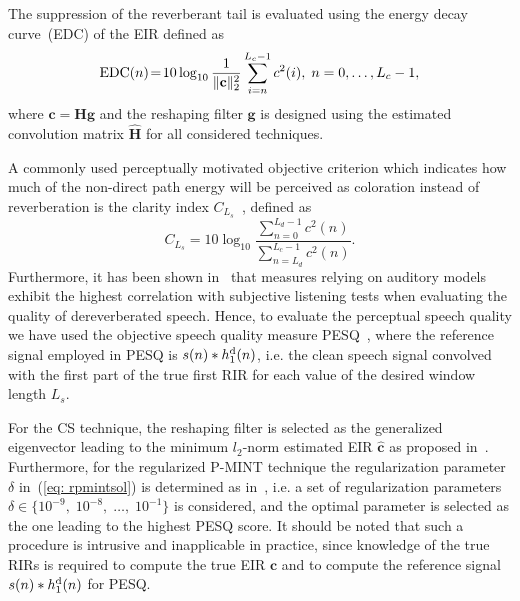 \documentclass{article}
\begin{document}
The suppression of the reverberant tail is evaluated using the energy decay curve~(EDC) of the EIR defined as
\begin{equation}
 \hbox{EDC}(n)\! = \!10 \log_{10}\frac{1}{\|\mathbf{c}\|_2^2}\sum_{i=n}^{L_c-1}c^2(i), \; n = 0,  \ldots,  L_c-1,
\end{equation}
where $\mathbf{c} = \mathbf{H}\mathbf{g}$ and the reshaping filter $\mathbf{g}$ is designed using the estimated convolution matrix $\hat{\mathbf{H}}$ for all considered techniques.

A commonly used perceptually motivated objective criterion which indicates how much of the non-direct path energy will be perceived as coloration instead of reverberation is the clarity index $C_{L_s}$~\cite{Naylor_Derev_book}, defined as
\begin{equation}
  C_{L_s} = 10 \log_{10}  \frac{\sum_{n = 0}^{L_d-1} c^2(n)}{\sum_{n = L_d}^{L_c-1} c^2(n)}.
\end{equation}
Furthermore, it has been shown in~\cite{Goetze_AES_2010} that measures relying on auditory models exhibit the highest correlation with subjective listening tests when evaluating the quality of dereverberated speech.
Hence, to evaluate the perceptual speech quality we have used the objective speech quality measure PESQ~\cite{PESQ}, where the reference signal employed in PESQ is $s(n) \ast h_1^{\rm d}(n)$, i.e. the clean speech signal convolved with the first part of the true first RIR for each value of the desired window length $L_s$.

For the CS technique, the reshaping filter is selected as the generalized eigenvector leading to the minimum $l_2$-norm estimated EIR $\hat{\mathbf{c}}$ as proposed in~\cite{Zhang_IWAENC_2010}. Furthermore, for the regularized P-MINT technique the regularization parameter $\delta$ in~(\ref{eq: rpmintsol}) is determined as in~\cite{Kodrasi_IWAENC_2012}, i.e. a set of regularization parameters $\delta \in \{10^{-9}, \; 10^{-8}, \; \ldots, \; 10^{-1} \}$ is considered, and the optimal parameter is selected as the one leading to the highest PESQ score.
It should be noted that such a procedure is intrusive and inapplicable in practice, since knowledge of the true RIRs is required to compute the true EIR $\mathbf{c}$ and to compute the reference signal $s(n) \ast h_1^{\rm d}(n)$ for PESQ.
\end{document}
